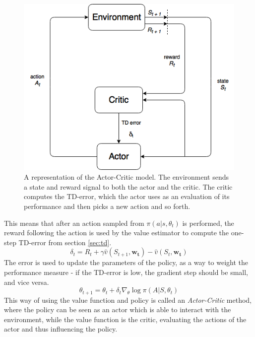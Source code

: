 \documentclass[11pt]{article}
\begin{document}
\begin{figure}[!h]
    \centering
    \includegraphics[scale = 0.5]{include/ActorCriticDiagram.png}
    \caption{A representation of the Actor-Critic model.
        The environment sends a state and reward signal to both the actor and the critic.
        The critic computes the TD-error, which the actor uses as an evaluation of its performance
        and then picks a new action and so forth.}
    \label{fig:actor-critic}
\end{figure}

This means that after an action sampled from $\pi(a|s,\theta_t)$ is performed,
the reward following the action is used by the value estimator to
compute the one-step TD-error from section \ref{sec:td}.
\begin{equation*}
    \delta_t =  R_t + \gamma \hat{v} (S_{t+1}, \mathbf{w_t}) - \hat{v}(S_t, \mathbf{w_t})
\end{equation*}
The error is used to update the parameters of the policy,
as a way to weight the performance measure - if the TD-error is low,
the gradient step should be small, and vice versa.
\begin{equation}\label{eq:ac_theta}
    \theta_{t+1} = \theta_t + \delta_t \nabla_{\theta} \log \pi(A | S, \theta_t)
\end{equation}
This way of using the value function and policy is called an
\textit{Actor-Critic} method, where the policy can be seen as an actor
which is able to interact with the environment, while the value function
is the critic, evaluating the actions of the actor and thus
influencing the policy.
\end{document}
